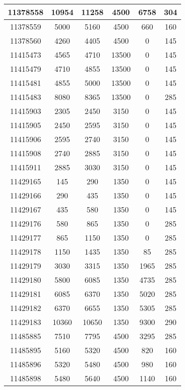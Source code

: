 \begin{appendices}
\begin{center}
\begin{longtable}{|c|c|c|c|c|c|}
11378558 & 10954 & 11258 & 4500  & 6758  & 304 \\ \hline
11378559 & 5000  & 5160  & 4500  & 660   & 160 \\ \hline
11378560 & 4260  & 4405  & 4500  & 0     & 145 \\ \hline
11415473 & 4565  & 4710  & 13500 & 0     & 145 \\ \hline
11415479 & 4710  & 4855  & 13500 & 0     & 145 \\ \hline
11415481 & 4855  & 5000  & 13500 & 0     & 145 \\ \hline
11415483 & 8080  & 8365  & 13500 & 0     & 285 \\ \hline
11415903 & 2305  & 2450  & 3150  & 0     & 145 \\ \hline
11415905 & 2450  & 2595  & 3150  & 0     & 145 \\ \hline
11415906 & 2595  & 2740  & 3150  & 0     & 145 \\ \hline
11415908 & 2740  & 2885  & 3150  & 0     & 145 \\ \hline
11415911 & 2885  & 3030  & 3150  & 0     & 145 \\ \hline
11429165 & 145   & 290   & 1350  & 0     & 145 \\ \hline
11429166 & 290   & 435   & 1350  & 0     & 145 \\ \hline
11429167 & 435   & 580   & 1350  & 0     & 145 \\ \hline
11429176 & 580   & 865   & 1350  & 0     & 285 \\ \hline
11429177 & 865   & 1150  & 1350  & 0     & 285 \\ \hline
11429178 & 1150  & 1435  & 1350  & 85    & 285 \\ \hline
11429179 & 3030  & 3315  & 1350  & 1965  & 285 \\ \hline
11429180 & 5800  & 6085  & 1350  & 4735  & 285 \\ \hline
11429181 & 6085  & 6370  & 1350  & 5020  & 285 \\ \hline
11429182 & 6370  & 6655  & 1350  & 5305  & 285 \\ \hline
11429183 & 10360 & 10650 & 1350  & 9300  & 290 \\ \hline
11485885 & 7510  & 7795  & 4500  & 3295  & 285 \\ \hline
11485895 & 5160  & 5320  & 4500  & 820   & 160 \\ \hline
11485896 & 5320  & 5480  & 4500  & 980   & 160 \\ \hline
11485898 & 5480  & 5640  & 4500  & 1140  & 160 \\ \hline

\end{longtable}
\end{center}
\end{appendices}
